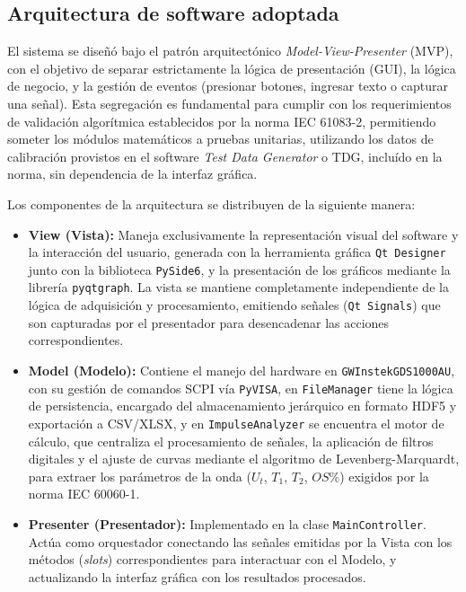\subsection{Arquitectura de software adoptada}

El sistema se diseñó bajo el patrón arquitectónico \textit{Model-View-Presenter} (MVP), con el objetivo de separar estrictamente la lógica de presentación (GUI), la lógica de negocio, y la gestión de eventos (presionar botones, ingresar texto o capturar una señal). Esta segregación es fundamental para cumplir con los requerimientos de validación algorítmica establecidos por la norma IEC 61083-2, permitiendo someter los módulos matemáticos a pruebas unitarias, utilizando los datos de calibración provistos en el software \textit{Test Data Generator} o TDG, incluído en la norma, sin dependencia de la interfaz gráfica.\par

Los componentes de la arquitectura se distribuyen de la siguiente manera:\par

\begin{itemize}
    \item \textbf{View (Vista):} Maneja exclusivamente la representación visual del software y la interacción del usuario, generada con la herramienta gráfica \texttt{Qt Designer} junto con la biblioteca \texttt{PySide6},  y la presentación de los gráficos mediante la librería \texttt{pyqtgraph}. La vista se mantiene completamente independiente de la lógica de adquisición y procesamiento, emitiendo señales (\texttt{Qt Signals}) que son capturadas por el presentador para desencadenar las acciones correspondientes.
    \item \textbf{Model (Modelo):} Contiene el manejo del hardware en \texttt{GWInstekGDS1000AU}, con su gestión de comandos SCPI vía \texttt{PyVISA}, en \texttt{FileManager} tiene la lógica de persistencia, encargado del almacenamiento jerárquico en formato HDF5 y exportación a CSV/XLSX, y en \texttt{ImpulseAnalyzer} se encuentra el motor de cálculo, que centraliza el procesamiento de señales, la aplicación de filtros digitales y el ajuste de curvas mediante el algoritmo de Levenberg-Marquardt, para extraer los parámetros de la onda ($U_t$, $T_1$, $T_2$, $OS\%$) exigidos por la norma IEC 60060-1.
    \item \textbf{Presenter (Presentador):} Implementado en la clase \texttt{MainController}. Actúa como orquestador conectando las señales emitidas por la Vista con los métodos (\textit{slots}) correspondientes para interactuar con el Modelo, y actualizando la interfaz gráfica con los resultados procesados.
\end{itemize}

